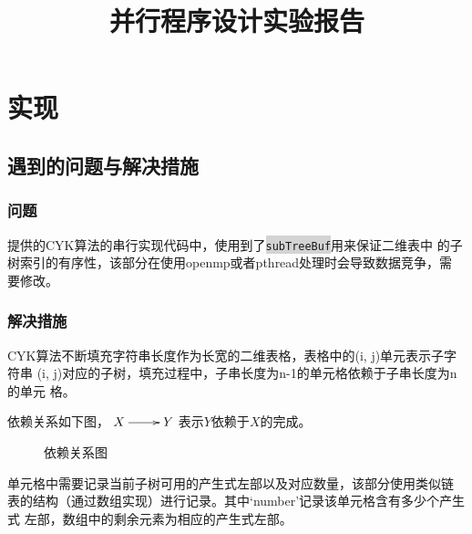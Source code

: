 \documentclass{ctexart}
\title{并行程序设计实验报告}
\author{}
\date{}
\newcommand{\mdcode}[1]{\texttt{\colorbox{lightgray}{#1}}}
\begin{document}
\maketitle
\tableofcontents
\newpage
\section{实现}
\subsection{遇到的问题与解决措施}
\subsubsection{问题}
提供的CYK算法的串行实现代码中，使用到了\mdcode{subTreeBuf}用来保证二维表中
的子树索引的有序性，该部分在使用openmp或者pthread处理时会导致数据竞争，需
要修改。
\subsubsection{解决措施}
CYK算法不断填充字符串长度作为长宽的二维表格，表格中的(i, j)单元表示子字符串
(i, j)对应的子树，填充过程中，子串长度为n-1的单元格依赖于子串长度为n的单元
格。

依赖关系如下图，$\xymatrix{ X\ar[r] & Y }$表示$Y$依赖于$X$的完成。

\begin{figure}[h]
  \centering
  \caption{依赖关系图}
  \label{fig:dep}
\end{figure}

单元格中需要记录当前子树可用的产生式左部以及对应数量，该部分使用类似链
表的结构（通过数组实现）进行记录。其中`number'记录该单元格含有多少个产生式
左部，数组中的剩余元素为相应的产生式左部。

\begin{center}
\end{center}
\end{document}

